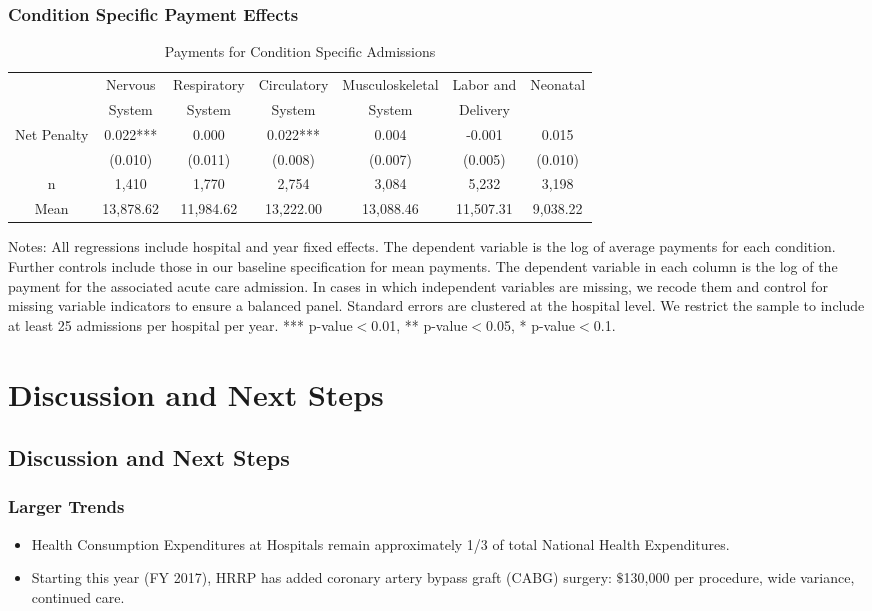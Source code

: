 \documentclass[ucs,9pt]{beamer}
\begin{document}
\begin{frame}
\frametitle{Condition Specific Payment Effects}
\begin{table}[htp]
\centering \normalsize
\caption{Payments for Condition Specific Admissions}
\scriptsize
\begin{tabular}{ccccccc}
\hline	
\hline
 							& Nervous  	& Respiratory  	 & Circulatory    & Musculoskeletal   		& Labor and & Neonatal \\
							&  System		&  System      	&  System     	&  System        		& Delivery   &	\\
\hline
Net Penalty 					& 0.022***		&	0.000 	&	0.022***	&	0.004	&	-0.001	&	0.015	\\
							& (0.010)		&	(0.011)	&	(0.008)	&	(0.007)	&	(0.005)	&	(0.010)	\\
\hline
n							& 1,410		&	1,770 	&	2,754  	&	3,084   	&	5,232	&	3,198	\\
Mean 						&13,878.62	&	11,984.62	&	13,222.00	&	13,088.46	&	11,507.31	&	9,038.22	\\
\hline
\end{tabular}
\end{table}
\tiny Notes: All regressions include hospital and year fixed effects.  The dependent variable is the log of average payments for each condition.  Further controls include those in our baseline specification for mean payments.  The dependent variable in each column is the log of the payment for the associated acute care admission.  In cases in which independent variables are missing, we recode them and control for missing variable indicators to ensure a balanced panel.  Standard errors are clustered at the hospital level.  We restrict the sample to include at least 25 admissions per hospital per year.  *** p-value$<$0.01, ** p-value$<$0.05, * p-value$<$0.1.
\end{frame}


\section{Discussion and Next Steps}
\subsection{Discussion and Next Steps}
\begin{frame}
\frametitle{Larger Trends}
\begin{itemize}
\item Health Consumption Expenditures at Hospitals remain approximately 1/3 of total National Health Expenditures.
\item  Starting this year (FY 2017), HRRP has added coronary artery bypass graft (CABG) surgery: $\$$130,000 per procedure, wide variance, continued care.
 \end{itemize}
\end{frame}
\end{document}
